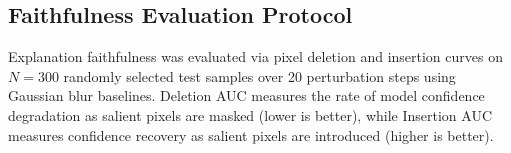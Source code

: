 \subsection{Faithfulness Evaluation Protocol}
Explanation faithfulness was evaluated via pixel deletion and insertion curves on $N=300$ randomly selected test samples over 20 perturbation steps using Gaussian blur baselines. Deletion AUC measures the rate of model confidence degradation as salient pixels are masked (lower is better), while Insertion AUC measures confidence recovery as salient pixels are introduced (higher is better).
